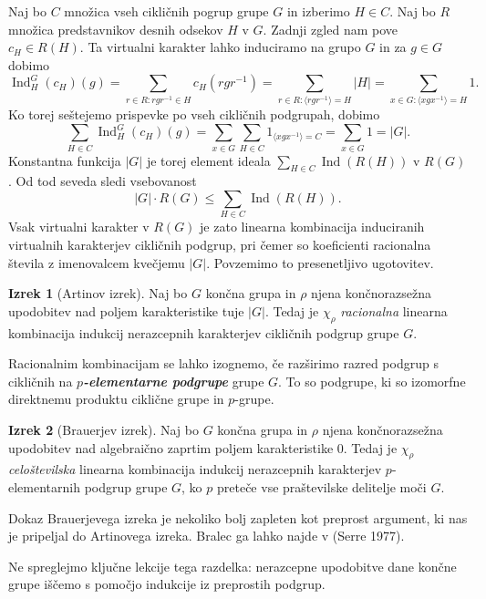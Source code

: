 \documentclass[11pt]{book}
\DeclareMathOperator\Ind{Ind}
\def\definicija{\color{rdeca}\bf\em}
\def\literatura{\color{modra}}
\theoremstyle{definition}
\theoremstyle{zgled}
\theoremstyle{odprtproblem}
\theoremstyle{domacanaloga}
\theoremstyle{izrek}
\newtheorem*{izrek}{Izrek}
\begin{document}
Naj bo $C$ množica vseh cikličnih pogrup grupe $G$ in izberimo $H \in C$. Naj bo $R$ množica predstavnikov desnih odsekov $H$ v $G$. Zadnji zgled nam pove $c_H \in R(H)$. Ta virtualni karakter lahko induciramo na grupo $G$ in za $g \in G$ dobimo
\[
    {\textstyle \Ind^G_H(c_H)(g)} = \sum_{r \in R \colon r g r^{-1} \in H} c_H(r g r^{-1}) =
    \sum_{r \in R \colon \langle r g r^{-1} \rangle = H} |H| =
    \sum_{x \in G \colon  \langle x g x^{-1} \rangle = H} 1.
\]
Ko torej seštejemo prispevke po vseh cikličnih podgrupah, dobimo
\[
  \sum_{H \in C} {\textstyle \Ind^G_H(c_H)(g)} = \sum_{x \in G} \sum_{H \in C} 1_{\langle x g x^{-1} \rangle = C} = \sum_{x \in G} 1 = |G|.  
\]
Konstantna funkcija $|G|$ je torej element ideala $\sum_{H \in C} \Ind(R(H))$ v $R(G)$. Od tod seveda sledi vsebovanost 
\[
    |G| \cdot R(G) \leq \sum_{H \in C} \Ind(R(H)).
\]
Vsak virtualni karakter v $R(G)$ je zato linearna kombinacija induciranih virtualnih karakterjev cikličnih podgrup, pri čemer so koeficienti racionalna števila z imenovalcem kvečjemu $|G|$. Povzemimo to presenetljivo ugotovitev.

\begin{izrek}[Artinov izrek]
Naj bo $G$ končna grupa in $\rho$ njena končnorazsežna upodobitev nad poljem karakteristike tuje $|G|$. Tedaj je $\chi_{\rho}$ \emph{racionalna} linearna kombinacija indukcij nerazcepnih karakterjev cikličnih podgrup grupe $G$.
\end{izrek}

Racionalnim kombinacijam se lahko izognemo, če razširimo razred podgrup s cikličnih na {\definicija $p$-elementarne podgrupe} grupe $G$. To so podgrupe, ki so izomorfne direktnemu produktu ciklične grupe in $p$-grupe.

\begin{izrek}[Brauerjev izrek]
Naj bo $G$ končna grupa in $\rho$ njena končnorazsežna upodobitev nad algebraično zaprtim poljem karakteristike $0$. Tedaj je $\chi_{\rho}$ \emph{celoštevilska} linearna kombinacija indukcij nerazcepnih karakterjev $p$-elementarnih podgrup grupe $G$, ko $p$ preteče vse praštevilske delitelje moči $G$.
\end{izrek}

Dokaz Brauerjevega izreka je nekoliko bolj zapleten kot preprost argument, ki nas je pripeljal do Artinovega izreka. Bralec ga lahko najde v {\literatura (Serre 1977)}. 

Ne spreglejmo ključne lekcije tega razdelka: nerazcepne upodobitve dane končne grupe iščemo s pomočjo indukcije iz preprostih podgrup.
\end{document}
